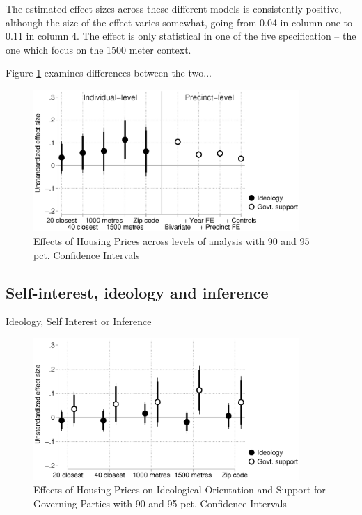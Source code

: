 \documentclass[12pt,a4paper]{article}
\begin{document}


The estimated effect sizes across these different models is consistently positive, although the size of the effect varies somewhat, going from 0.04 in column one to 0.11 in column 4. The effect is only statistical in one of the five specification -- the one which focus on the 1500 meter context. 

Figure \ref{comparison} examines differences between the two...



\begin{figure}[htbp!]
	\includegraphics[width=0.9\textwidth]{../figures/comparison.eps}
	\centering
	\caption{Effects of Housing Prices across levels of analysis with 90  and 95 pct. Confidence Intervals}\label{comparison}
\end{figure}


\subsection{Self-interest, ideology and inference}

Ideology, Self Interest or Inference



\begin{figure}[htbp!]
	\includegraphics[width=0.9\textwidth]{../figures/ideology.eps}
	\centering
	\caption{Effects of Housing Prices on Ideological Orientation and Support for Governing Parties with 90  and 95 pct. Confidence Intervals}\label{ideology}
\end{figure}
\end{document}
